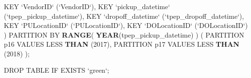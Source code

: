\documentclass[12pt,twoside]{reedthesis}
\newenvironment{Shaded}{\begin{snugshade}}{\end{snugshade}}
\newcommand{\KeywordTok}[1]{\textcolor[rgb]{0.13,0.29,0.53}{\textbf{#1}}}
\newcommand{\DataTypeTok}[1]{\textcolor[rgb]{0.13,0.29,0.53}{#1}}
\newcommand{\DecValTok}[1]{\textcolor[rgb]{0.00,0.00,0.81}{#1}}
\newcommand{\StringTok}[1]{\textcolor[rgb]{0.31,0.60,0.02}{#1}}
\newcommand{\NormalTok}[1]{#1}
\theoremstyle{definition}
\theoremstyle{definition}
\theoremstyle{definition}
\theoremstyle{remark}
\begin{document}
\begin{Shaded}
\begin{Highlighting}[]
\NormalTok{ KEY }\StringTok{`}\DataTypeTok{VendorID}\StringTok{`}\NormalTok{ (}\StringTok{`}\DataTypeTok{VendorID}\StringTok{`}\NormalTok{),}
\NormalTok{ KEY }\StringTok{`}\DataTypeTok{pickup_datetime}\StringTok{`}\NormalTok{ (}\StringTok{`}\DataTypeTok{tpep_pickup_datetime}\StringTok{`}\NormalTok{),}
\NormalTok{ KEY }\StringTok{`}\DataTypeTok{dropoff_datetime}\StringTok{`}\NormalTok{ (}\StringTok{`}\DataTypeTok{tpep_dropoff_datetime}\StringTok{`}\NormalTok{),}
\NormalTok{ KEY }\StringTok{`}\DataTypeTok{PULocationID}\StringTok{`}\NormalTok{ (}\StringTok{`}\DataTypeTok{PULocationID}\StringTok{`}\NormalTok{),}
\NormalTok{ KEY }\StringTok{`}\DataTypeTok{DOLocationID}\StringTok{`}\NormalTok{ (}\StringTok{`}\DataTypeTok{DOLocationID}\StringTok{`}\NormalTok{)}
\NormalTok{)}
\NormalTok{PARTITION BY }\KeywordTok{RANGE}\NormalTok{( }\KeywordTok{YEAR}\NormalTok{(tpep_pickup_datetime) ) (}
\NormalTok{  PARTITION p16 VALUES LESS }\KeywordTok{THAN}\NormalTok{ (}\DecValTok{2017}\NormalTok{),}
\NormalTok{  PARTITION p17 VALUES LESS }\KeywordTok{THAN}\NormalTok{ (}\DecValTok{2018}\NormalTok{)}
\NormalTok{);}


\NormalTok{DROP TABLE IF EXISTS }\StringTok{`}\DataTypeTok{green}\StringTok{`}\NormalTok{;}


\end{Highlighting}
\end{Shaded}
\end{document}
